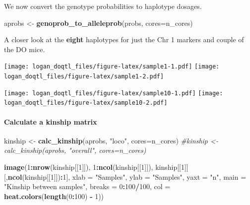 \documentclass[]{article}
\newenvironment{Shaded}{\begin{snugshade}}{\end{snugshade}}
\newcommand{\KeywordTok}[1]{\textcolor[rgb]{0.13,0.29,0.53}{\textbf{#1}}}
\newcommand{\DataTypeTok}[1]{\textcolor[rgb]{0.13,0.29,0.53}{#1}}
\newcommand{\DecValTok}[1]{\textcolor[rgb]{0.00,0.00,0.81}{#1}}
\newcommand{\StringTok}[1]{\textcolor[rgb]{0.31,0.60,0.02}{#1}}
\newcommand{\CommentTok}[1]{\textcolor[rgb]{0.56,0.35,0.01}{\textit{#1}}}
\newcommand{\OperatorTok}[1]{\textcolor[rgb]{0.81,0.36,0.00}{\textbf{#1}}}
\newcommand{\NormalTok}[1]{#1}
\let\oldparagraph\paragraph
\renewcommand{\paragraph}[1]{\oldparagraph{#1}\mbox{}}
\begin{document}
We now convert the genotype probabilities to haplotype dosages.

\begin{Shaded}
\begin{Highlighting}[]
\NormalTok{aprobs <-}\StringTok{ }\KeywordTok{genoprob_to_alleleprob}\NormalTok{(probs, }\DataTypeTok{cores=}\NormalTok{n_cores)}
\end{Highlighting}
\end{Shaded}

A closer look at the \textbf{eight} haplotypes for just the Chr 1
markers and couple of the DO mice.

\texttt{[image: logan\_doqtl\_files/figure-latex/sample1-1.pdf]}
\texttt{[image: logan\_doqtl\_files/figure-latex/sample1-2.pdf]}

\texttt{[image: logan\_doqtl\_files/figure-latex/sample10-1.pdf]}
\texttt{[image: logan\_doqtl\_files/figure-latex/sample10-2.pdf]}

\paragraph{\texorpdfstring{\textbf{Calculate a kinship
matrix}}{Calculate a kinship matrix}}\label{calculate-a-kinship-matrix}

\begin{Shaded}
\begin{Highlighting}[]
\NormalTok{kinship <-}\StringTok{ }\KeywordTok{calc_kinship}\NormalTok{(aprobs, }\StringTok{"loco"}\NormalTok{, }\DataTypeTok{cores=}\NormalTok{n_cores)}
\CommentTok{#kinship <- calc_kinship(aprobs, "overall", cores=n_cores)}

\KeywordTok{image}\NormalTok{(}\DecValTok{1}\OperatorTok{:}\KeywordTok{nrow}\NormalTok{(kinship[[}\DecValTok{1}\NormalTok{]]), }\DecValTok{1}\OperatorTok{:}\KeywordTok{ncol}\NormalTok{(kinship[[}\DecValTok{1}\NormalTok{]]), kinship[[}\DecValTok{1}\NormalTok{]][,}\KeywordTok{ncol}\NormalTok{(kinship[[}\DecValTok{1}\NormalTok{]])}\OperatorTok{:}\DecValTok{1}\NormalTok{], }\DataTypeTok{xlab =} \StringTok{"Samples"}\NormalTok{, }
      \DataTypeTok{ylab =} \StringTok{"Samples"}\NormalTok{, }\DataTypeTok{yaxt =} \StringTok{"n"}\NormalTok{, }\DataTypeTok{main =} \StringTok{"Kinship between samples"}\NormalTok{, }
      \DataTypeTok{breaks =} \DecValTok{0}\OperatorTok{:}\DecValTok{100}\OperatorTok{/}\DecValTok{100}\NormalTok{, }\DataTypeTok{col =} \KeywordTok{heat.colors}\NormalTok{(}\KeywordTok{length}\NormalTok{(}\DecValTok{0}\OperatorTok{:}\DecValTok{100}\NormalTok{) }\OperatorTok{-}\StringTok{ }\DecValTok{1}\NormalTok{))}
\end{Highlighting}
\end{Shaded}
\end{document}
